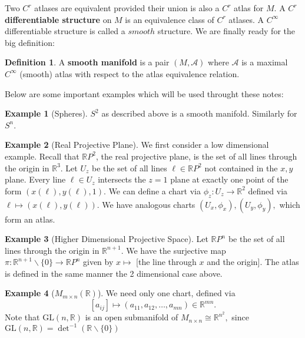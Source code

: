 \documentclass{article}
\theoremstyle{definition}
\newtheorem{ex}{Example}[section]
\newtheorem{defn}{Definition}[section]
\newcommand{\R}{\mathbb{R}}
\begin{document}
Two $C^{r}$ atlases are equivalent provided their union is also a $C^{r}$ atlas for $M$. A $C^{r}$ \textbf{differentiable structure} on $M$ is an equivalence class of $C^{r}$ atlases. A $C^{\infty}$ differentiable structure is called a $smooth$ structure. We are finally ready for the big definition:
\begin{defn} 
A \textbf{smooth manifold} is a pair $(M,\mathcal{A})$ where $\mathcal{A}$ is a maximal $C^{\infty}$ (smooth) atlas with respect to the atlas equivalence relation. 
\end{defn}
Below are some important examples which will be used throught these notes:
\begin{ex}[Spheres]
$S^{2}$ as described above is a smooth manifold. Similarly for $S^{n}$. 
\end{ex}
\begin{ex}[Real Projective Plane]
We first consider a low dimensional example. Recall that $\R P^{2}$, the real projective plane, is the set of all lines through the origin in $\R^{3}$. Let $U_{z}$ be the set of all lines $\ell\in\R P^{2}$ not contained in the $x,y$ plane. Every line $\ell\in U_{z}$ intersects the $z=1$ plane at exactly one point of the form $(x(\ell),y(\ell),1).$ We can define a chart via $\phi_{z}:U_{z}\rightarrow\R^{2}$ defined via $\ell\mapsto (x(\ell),y(\ell)).$ We have analogous charts $(U_{x},\phi_{x}),(U_{y},\phi_{y}),$ which form an atlas.  
\end{ex}
\begin{ex}[Higher Dimensional Projective Space]
Let $\R P^{n}$ be the set of all lines through the origin in $\R^{n+1}.$ We have the surjective map $\pi:\R^{n+1}\backslash\{0\}\rightarrow\R P^{n}$ given by $x\mapsto$ [the line through $x$ and the origin]. The atlas is defined in the same manner the 2 dimensional case above.  
\end{ex}
\begin{ex}[$M_{m\times n}(\R)$]
We need only one chart, defined via \[[a_{ij}]\mapsto(a_{11},a_{12},\dots,a_{mn})\in\R^{mn}.\] Note that $\text{GL}(n,\R)$ is an open submanifold of $M_{n\times n}\cong\R^{n^{2}},$ since $\text{GL}(n,\R)=\det^{-1}(\R\backslash\{0\})$
\end{ex}
\end{document}
